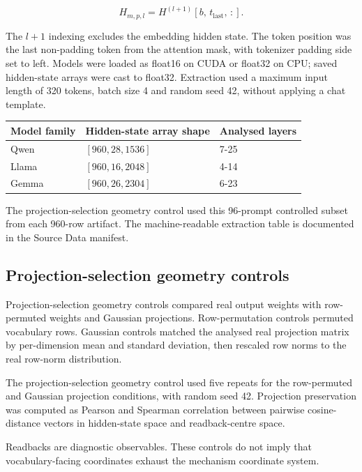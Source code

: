 \documentclass[11pt]{article}
\begin{document}
\begin{equation*}
H_{m,p,l}=H^{(l+1)}\!\left[b,\,t_{\mathrm{last}},\,:\right].
\end{equation*}

The \(l+1\) indexing excludes the embedding hidden state. The token position was the last non-padding token from the attention mask, with tokenizer padding side set to left. Models were loaded as float16 on CUDA or float32 on CPU; saved hidden-state arrays were cast to float32. Extraction used a maximum input length of 320 tokens, batch size 4 and random seed 42, without applying a chat template.

\begin{table}[H]
\centering\scriptsize\sloppy
\begin{tabularx}{\textwidth}{@{}XXX@{}}
\toprule
Model family & Hidden-state array shape & Analysed layers \\
\midrule
Qwen & \([960,28,1536]\) & 7-25 \\
Llama & \([960,16,2048]\) & 4-14 \\
Gemma & \([960,26,2304]\) & 6-23 \\
\bottomrule
\end{tabularx}
\end{table}

The projection-selection geometry control used this 96-prompt controlled subset from each 960-row artifact. The machine-readable extraction table is documented in the Source Data manifest.

\subsection*{Projection-selection geometry controls}
Projection-selection geometry controls compared real output weights with row-permuted weights and Gaussian projections. Row-permutation controls permuted vocabulary rows. Gaussian controls matched the analysed real projection matrix by per-dimension mean and standard deviation, then rescaled row norms to the real row-norm distribution.

The projection-selection geometry control used five repeats for the row-permuted and Gaussian projection conditions, with random seed 42. Projection preservation was computed as Pearson and Spearman correlation between pairwise cosine-distance vectors in hidden-state space and readback-centre space.

Readbacks are diagnostic observables. These controls do not imply that vocabulary-facing coordinates exhaust the mechanism coordinate system.
\end{document}
